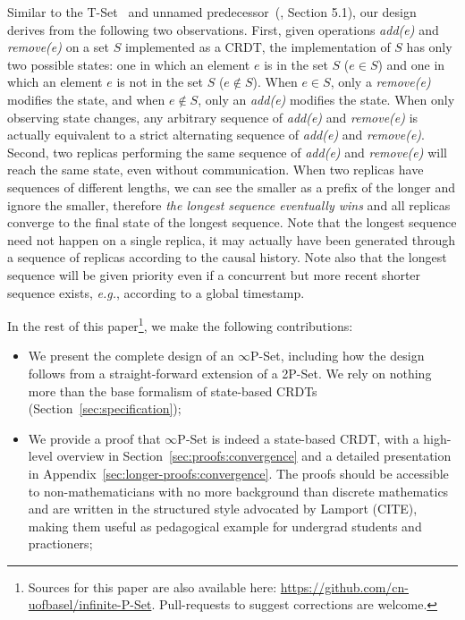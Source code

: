 \documentclass[11pt, oneside]{article}   	%
\begin{document}
Similar to the T-Set~\cite{Dolan2020undoable} and unnamed predecessor~(\cite{Yu2019undo}, Section 5.1), our design derives from the following two observations. First, given operations \textit{add(e)} and \textit{remove(e)} on a set $S$ implemented as a CRDT, the implementation of $S$ has only two possible states: one in which an element $e$ is in the set $S$ ($e \in S$) and one in which an element $e$ is not in the set $S$ ($e \notin S$). When $e \in S$, only a \textit{remove(e)} modifies the state, and when $e \notin S$, only an \textit{add(e)} modifies the state. When only observing state changes, any arbitrary sequence of \textit{add(e)} and \textit{remove(e)} is actually equivalent to a strict alternating sequence of \textit{add(e)} and \textit{remove(e)}. Second, two replicas performing the same sequence of \textit{add(e)} and \textit{remove(e)} will reach the same state, even without communication. When two replicas have sequences of different lengths, we can see the smaller as a prefix of the longer and ignore the smaller, therefore \textit{the longest sequence eventually wins} and all replicas converge to the final state of the longest sequence. Note that the longest sequence need not happen on a single replica, it may actually have been generated through a sequence of replicas according to the causal history. Note also that the longest sequence will be given priority even if a concurrent but more recent shorter sequence exists, \textit{e.g.}, according to a global timestamp.  

In the rest of this paper\footnote{Sources for this paper are also available here: \url{https://github.com/cn-uofbasel/infinite-P-Set}. Pull-requests to suggest corrections are welcome.}, we make the following contributions:
\begin{itemize}
	\item We present the complete design of an $\infty$P-Set, including how the design follows from a straight-forward extension of a 2P-Set. We rely on nothing more than the base formalism of state-based CRDTs (Section~\ref{sec:specification});
	\item We provide a proof that $\infty$P-Set is indeed a state-based CRDT, with a high-level overview in Section~\ref{sec:proofs:convergence} and a detailed presentation in Appendix~\ref{sec:longer-proofs:convergence}. The proofs should be accessible to non-mathematicians with no more background than discrete mathematics and are written in the structured style advocated by Lamport (CITE), making them useful as pedagogical example for undergrad students and practioners;
\end{itemize}
\end{document}
